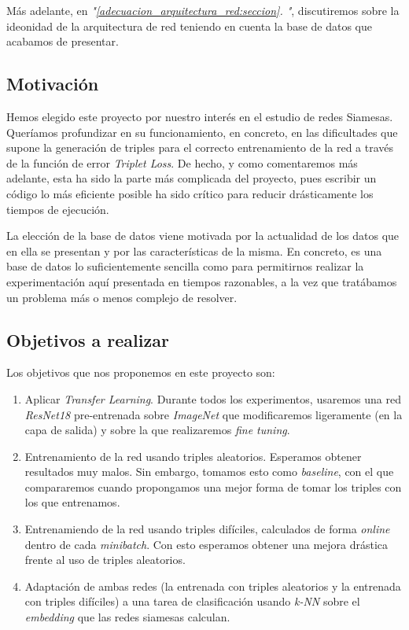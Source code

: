 \documentclass[11pt]{article}
\newcommand{\customcite}[1]{\emph{"\ref{#1}. \nameref{#1}"}}
\begin{document}
Más adelante, en \customcite{adecuacion_arquitectura_red:seccion}, discutiremos sobre la ideonidad de la arquitectura de red teniendo en cuenta la base de datos que acabamos de presentar.

\subsection{Motivación} \label{motivacion:seccion}

Hemos elegido este proyecto por nuestro interés en el estudio de redes Siamesas. Queríamos profundizar en su funcionamiento, en concreto, en las dificultades que supone la generación de triples para el correcto entrenamiento de la red a través de la función de error \emph{Triplet Loss}. De hecho, y como comentaremos más adelante, esta ha sido la parte más complicada del proyecto, pues escribir un código lo más eficiente posible ha sido crítico para reducir drásticamente los tiempos de ejecución.

La elección de la base de datos viene motivada por la actualidad de los datos que en ella se presentan y por las características de la misma. En concreto, es una base de datos lo suficientemente sencilla como para permitirnos realizar la experimentación aquí presentada en tiempos razonables, a la vez que tratábamos un problema más o menos complejo de resolver.

\subsection{Objetivos a realizar}

Los objetivos que nos proponemos en este proyecto son: 

\begin{enumerate}
  \item Aplicar \emph{Transfer Learning}. Durante todos los experimentos, usaremos una red \emph{ResNet18} pre-entrenada sobre \emph{ImageNet} que modificaremos ligeramente (en la capa de salida) y sobre la que realizaremos \emph{fine tuning}.
  \item Entrenamiento de la red usando triples aleatorios. Esperamos obtener resultados muy malos. Sin embargo, tomamos esto como \emph{baseline}, con el que compararemos cuando propongamos una mejor forma de tomar los triples con los que entrenamos.
  \item Entrenamiendo de la red usando triples difíciles, calculados de forma \emph{online} dentro de cada \emph{minibatch}. Con esto esperamos obtener una mejora drástica frente al uso de triples aleatorios.
  \item Adaptación de ambas redes (la entrenada con triples aleatorios y la entrenada con triples difíciles) a una tarea de clasificación usando \emph{k-NN} sobre el \emph{embedding} que las redes siamesas calculan.
\end{enumerate}
\end{document}
